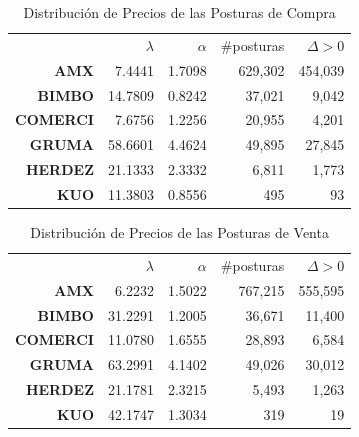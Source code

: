 \documentclass[11pt]{article}
\numberwithin{equation}{section} %
\begin{document}
\begin{table}[htbp]
\centering
\caption{Distribución de Precios de las Posturas de Compra}
\begin{tabular}{r|r|r|r|r|}
\cline{2-5}
& $\lambda$ & $\alpha$ & \#posturas & $\Delta>0$ \\
\cline{2-5}
\textbf{AMX}   & 7.4441 & 1.7098 & 629,302 & 454,039 \\
\textbf{BIMBO} & 14.7809 & 0.8242 & 37,021 & 9,042 \\
\textbf{COMERCI}   & 7.6756 & 1.2256 & 20,955 & 4,201 \\
\textbf{GRUMA} & 58.6601 & 4.4624 & 49,895 & 27,845 \\
\textbf{HERDEZ} & 21.1333 & 2.3332 & 6,811 & 1,773 \\
\textbf{KUO}   & 11.3803 & 0.8556 & 495   & 93 \\
\cline{2-5}
\end{tabular}%
\label{tab:powercompra}%
\end{table}%

\begin{table}[htbp]
\centering
\caption{Distribución de Precios de las Posturas de Venta}
\begin{tabular}{r|r|r|r|r|}
\cline{2-5}
& $\lambda$ & $\alpha$ & \#posturas & $\Delta>0$ \\
\cline{2-5}
\textbf{AMX}   & 6.2232 & 1.5022 & 767,215 & 555,595 \\
\textbf{BIMBO} & 31.2291 & 1.2005 & 36,671 & 11,400 \\
\textbf{COMERCI}   & 11.0780 & 1.6555 & 28,893 & 6,584 \\
\textbf{GRUMA} & 63.2991 & 4.1402 & 49,026 & 30,012 \\
\textbf{HERDEZ} & 21.1781 & 2.3215 & 5,493 & 1,263 \\
\textbf{KUO}   & 42.1747 & 1.3034 & 319   & 19 \\
\cline{2-5}
\end{tabular}%
\label{tab:powerventa}%
\end{table}%
\end{document}
